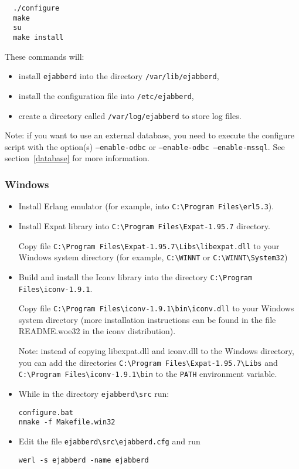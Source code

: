 \documentclass[a4paper,10pt]{article}
\newcommand{\term}[1]{\texttt{#1}}
\newcommand{\ejabberd}{\texttt{ejabberd}}
\begin{document}
\begin{verbatim}
  ./configure
  make
  su
  make install
\end{verbatim}

These commands will:
\begin{itemize}
\item install \ejabberd{} into the directory \verb|/var/lib/ejabberd|,
\item install the configuration file into \verb|/etc/ejabberd|,
\item create a directory called \verb|/var/log/ejabberd| to store log files.
\end{itemize}

Note: if you want to use an external database, you need to execute the configure
script with the option(s) \term{--enable-odbc} or \term{--enable-odbc
--enable-mssql}. See section~\ref{database} for more information.

\subsubsection{Windows}
\label{compilewin}

\begin{itemize}
\item Install Erlang emulator (for example, into \verb|C:\Program Files\erl5.3|).
\item Install Expat library into \verb|C:\Program Files\Expat-1.95.7|
  directory.

  Copy file \verb|C:\Program Files\Expat-1.95.7\Libs\libexpat.dll|
  to your Windows system directory (for example, \verb|C:\WINNT| or
  \verb|C:\WINNT\System32|)
\item Build and install the Iconv library into the directory
  \verb|C:\Program Files\iconv-1.9.1|.

  Copy file \verb|C:\Program Files\iconv-1.9.1\bin\iconv.dll| to your
  Windows system directory (more installation instructions can be found in the
  file README.woe32 in the iconv distribution).

  Note: instead of copying libexpat.dll and iconv.dll to the Windows
  directory, you can add the directories
  \verb|C:\Program Files\Expat-1.95.7\Libs| and
  \verb|C:\Program Files\iconv-1.9.1\bin| to the \verb|PATH| environment
  variable.
\item While in the directory \verb|ejabberd\src| run:
\begin{verbatim}
configure.bat
nmake -f Makefile.win32
\end{verbatim}
\item Edit the file \verb|ejabberd\src\ejabberd.cfg| and run
\begin{verbatim}
werl -s ejabberd -name ejabberd
\end{verbatim}
\end{itemize}
\end{document}
